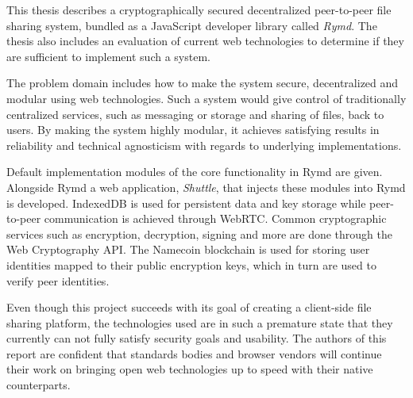 %

This thesis describes a cryptographically secured decentralized peer-to-peer file sharing system, bundled as a JavaScript developer library called \emph{Rymd}. The thesis also includes an evaluation of current web technologies to determine if they are sufficient to implement such a system.

The problem domain includes how to make the system secure, decentralized and modular using web technologies. Such a system would give control of traditionally centralized services, such as messaging or storage and sharing of files, back to users. By making the system highly modular, it achieves satisfying results in reliability and technical agnosticism with regards to underlying implementations.

Default implementation modules of the core functionality in Rymd are given. Alongside Rymd a web application, \emph{Shuttle}, that injects these modules into Rymd is developed. IndexedDB is used for persistent data and key storage while peer-to-peer communication is achieved through WebRTC. Common cryptographic services such as encryption, decryption, signing and more are done through the Web Cryptography API. The Namecoin blockchain is used for storing user identities mapped to their public encryption keys, which in turn are used to verify peer identities.

Even though this project succeeds with its goal of creating a client-side file sharing platform, the technologies used are in such a premature state that they currently can not fully satisfy security goals and usability. The authors of this report are confident that standards bodies and browser vendors will continue their work on bringing open web technologies up to speed with their native counterparts.
